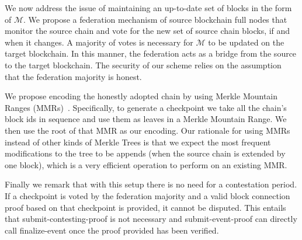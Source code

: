 We now address the issue of maintaining an up-to-date set of blocks in the form of $\mathcal{M}$. We propose a federation mechanism of source blockchain full nodes that monitor the source chain and vote for the new set of source chain blocks, if and when it changes. A majority of votes is necessary for $\mathcal{M}$ to be updated on the target blockchain. In this manner, the federation acts as a bridge from the source to the target blockchain. The security of our scheme relies on the assumption that the federation majority is honest.

We propose encoding the honestly adopted chain by using Merkle Mountain Ranges (MMRs)~\cite{flyclient}. Specifically, to generate a checkpoint we take all the chain's block ids in sequence and use them as leaves in a Merkle Mountain Range. We then use the root of that MMR as our encoding. Our rationale for using MMRs instead of other kinds of Merkle Trees is that we expect the most frequent modifications to the tree to be appends (when the source chain is extended by one block), which is a very efficient operation to perform on an existing MMR.

Finally we remark that with this setup there is no need for a contestation period. If a checkpoint is voted by the federation majority and a valid block connection proof based on that checkpoint is provided, it cannot be disputed. This entails that \textsf{submit-contesting-proof} is not necessary and \textsf{submit-event-proof} can directly call \textsf{finalize-event} once the proof provided has been verified.
